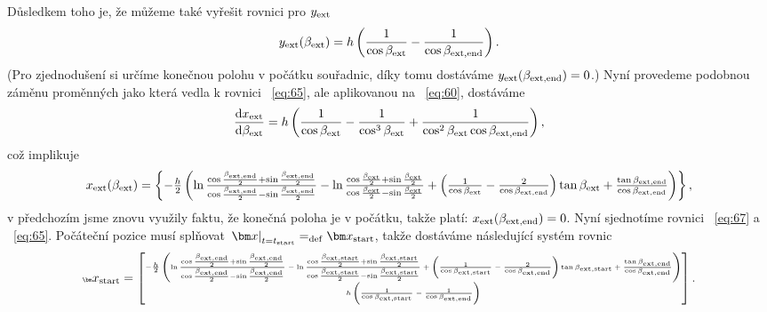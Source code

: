 \documentclass[reqno, a4paper]{amsart}
\begin{document}
Důsledkem toho je, že můžeme také vyřešit rovnici pro $y_{\mathrm{ext}}$
\begin{equation}
  \label{eq:65}
  y_{\mathrm{ext}}(\beta_{\mathrm{ext}})
  =
  h
  \left(
    \frac{1}{\cos \beta_{\mathrm{ext}}}
    -
    \frac{1}{\cos \beta_{\mathrm{ext}, \mathrm{end}}}
  \right)
  .
\end{equation}
(Pro zjednodušení si určíme konečnou polohu v počátku souřadnic, díky tomu dostáváme $y_{\mathrm{ext}}(\beta_{\mathrm{ext}, \mathrm{end}}) = 0$.)
Nyní provedeme podobnou záměnu proměnných jako která vedla k rovnici ~\eqref{eq:65}, ale aplikovanou na ~\eqref{eq:60}, dostáváme
\begin{equation}
  \label{eq:66}
  \frac{\mathrm{d} {x_{\mathrm{ext}}}}{\mathrm{d} {\beta_{\mathrm{ext}}}}
  =
  h
  \left(
    \frac{1}{\cos \beta_{\mathrm{ext}}}
    -
    \frac{1}{\cos^3 \beta_{\mathrm{ext}}}
    +
    \frac{1}{\cos^2 \beta_{\mathrm{ext}} \cos \beta_{\mathrm{ext}, \mathrm{end}}}
  \right)
  ,
\end{equation}
což implikuje
\begin{equation}
  \label{eq:67}
  x_{\mathrm{ext}}(\beta_{\mathrm{ext}})
  =
  \begin{Bmatrix}
  	-
  	\frac{h}{2}
  	\left(
  	\ln
  	\frac{\cos \frac{\beta_{\mathrm{ext}, \mathrm{end}}}{2} + \sin \frac{\beta_{\mathrm{ext}, \mathrm{end}}}{2}}{\cos \frac{\beta_{\mathrm{ext}, \mathrm{end}}}{2} - \sin \frac{\beta_{\mathrm{ext}, \mathrm{end}}}{2}}
  	-
  	\ln
  	\frac{\cos \frac{\beta_{\mathrm{ext}}}{2} + \sin \frac{\beta_{\mathrm{ext}}}{2}}{\cos \frac{\beta_{\mathrm{ext}}}{2} - \sin \frac{\beta_{\mathrm{ext}}}{2}}
  	+
  	\left(
  	\frac{1}{\cos \beta_{\mathrm{ext}}}
  	-
  	\frac{2}{\cos \beta_{\mathrm{ext}, \mathrm{end}}}
  	\right)
  	\tan\beta_{\mathrm{ext}}
  	+
  	\frac{ \tan\beta_{\mathrm{ext}, \mathrm{end}}}{\cos \beta_{\mathrm{ext}, \mathrm{end}}}
  	\right)
  \end{Bmatrix}
	,
\end{equation}
v předchozím jsme znovu využily faktu, že konečná poloha je v počátku, takže platí: $x_{\mathrm{ext}}(\beta_{\mathrm{ext}, \mathrm{end}}) = 0$. Nyní sjednotíme rovnici ~\eqref{eq:67} a ~\eqref{eq:65}. Počáteční pozice musí splňovat $ \left. \vec{x} \right|_{t=t_\navstart} = _{\bydefinition} \vec{x}_{\navstart}$, takže dostáváme následující systém rovnic
\begin{equation}
  \label{eq:68}
  {\tiny \vec{x}_{\navstart}
  	=
  	\begin{bmatrix}
  		-
  		\frac{h}{2}
  		\left(
  		\ln
  		\frac{\cos \frac{\beta_{\navext, \navend}}{2} + \sin \frac{\beta_{\navext, \navend}}{2}}{\cos \frac{\beta_{\navext, \navend}}{2} - \sin \frac{\beta_{\navext, \navend}}{2}}
  		-
  		\ln
  		\frac{\cos \frac{\beta_{\navext, \navstart}}{2} + \sin \frac{\beta_{\navext, \navstart}}{2}}{\cos \frac{\beta_{\navext, \navstart}}{2} - \sin \frac{\beta_{\navext, \navstart}}{2}}
  		+
  		\left(
  		\frac{1}{\cos \beta_{\navext, \navstart}}
  		-
  		\frac{2}{\cos \beta_{\navext, \navend}}
  		\right)
  		\tan\beta_{\navext, \navstart}
  		+
  		\frac{ \tan\beta_{\navext, \navend}}{\cos \beta_{\navext, \navend}}
  		\right)
  		\\
  		h
  		\left(
  		\frac{1}{\cos \beta_{\navext, \navstart}}
  		-
  		\frac{1}{\cos \beta_{\navext, \navend}}
  		\right)
  	\end{bmatrix}
  	.}
\end{equation}
\end{document}
